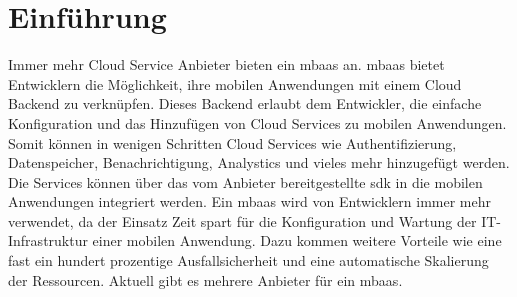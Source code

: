 \section{Einführung}
Immer mehr Cloud Service Anbieter bieten ein \gls{mbaas} an. \gls{mbaas} bietet Entwicklern die Möglichkeit, ihre mobilen Anwendungen mit einem Cloud Backend zu verknüpfen. Dieses Backend erlaubt dem Entwickler, die einfache Konfiguration und das Hinzufügen von Cloud Services zu mobilen Anwendungen. Somit können in wenigen Schritten Cloud Services wie Authentifizierung, Datenspeicher, Benachrichtigung, Analystics und vieles mehr hinzugefügt werden. Die Services können über das vom Anbieter bereitgestellte \gls{sdk} in die mobilen Anwendungen integriert werden. Ein \gls{mbaas} wird von Entwicklern immer mehr verwendet, da der Einsatz Zeit spart für die Konfiguration und Wartung der IT-Infrastruktur einer mobilen Anwendung. Dazu kommen weitere Vorteile wie eine fast ein hundert prozentige Ausfallsicherheit und eine automatische Skalierung der Ressourcen. Aktuell gibt es mehrere Anbieter für ein \gls{mbaas}.

